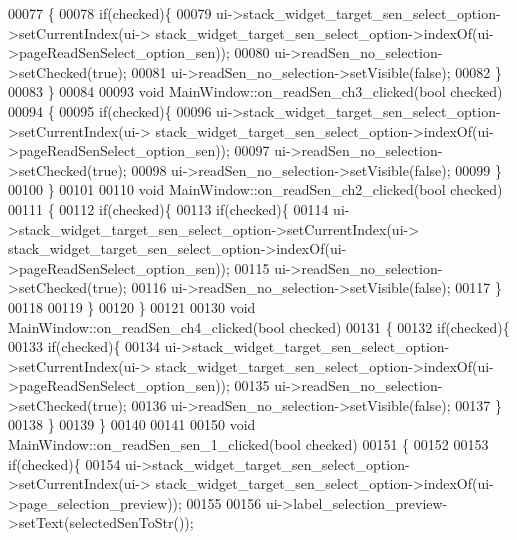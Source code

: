 \begin{DoxyCode}
00077 \{
00078     \textcolor{keywordflow}{if}(checked)\{
00079          ui->stack\_widget\_target\_sen\_select\_option->setCurrentIndex(ui->
      stack\_widget\_target\_sen\_select\_option->indexOf(ui->pageReadSenSelect\_option\_sen));
00080          ui->readSen\_no\_selection->setChecked(\textcolor{keyword}{true});
00081          ui->readSen\_no\_selection->setVisible(\textcolor{keyword}{false});
00082    \}
00083 \}
00084 
00093 \textcolor{keywordtype}{void} MainWindow::on\_readSen\_ch3\_clicked(\textcolor{keywordtype}{bool} checked)
00094 \{
00095     \textcolor{keywordflow}{if}(checked)\{
00096         ui->stack\_widget\_target\_sen\_select\_option->setCurrentIndex(ui->
      stack\_widget\_target\_sen\_select\_option->indexOf(ui->pageReadSenSelect\_option\_sen));
00097         ui->readSen\_no\_selection->setChecked(\textcolor{keyword}{true});
00098         ui->readSen\_no\_selection->setVisible(\textcolor{keyword}{false});
00099   \}
00100 \}
00101 
00110 \textcolor{keywordtype}{void} MainWindow::on\_readSen\_ch2\_clicked(\textcolor{keywordtype}{bool} checked)
00111 \{
00112     \textcolor{keywordflow}{if}(checked)\{
00113         \textcolor{keywordflow}{if}(checked)\{
00114              ui->stack\_widget\_target\_sen\_select\_option->setCurrentIndex(ui->
      stack\_widget\_target\_sen\_select\_option->indexOf(ui->pageReadSenSelect\_option\_sen));
00115              ui->readSen\_no\_selection->setChecked(\textcolor{keyword}{true});
00116              ui->readSen\_no\_selection->setVisible(\textcolor{keyword}{false});
00117        \}
00118 
00119    \}
00120 \}
00121 
00130 \textcolor{keywordtype}{void} MainWindow::on\_readSen\_ch4\_clicked(\textcolor{keywordtype}{bool} checked)
00131 \{
00132    \textcolor{keywordflow}{if}(checked)\{
00133        \textcolor{keywordflow}{if}(checked)\{
00134             ui->stack\_widget\_target\_sen\_select\_option->setCurrentIndex(ui->
      stack\_widget\_target\_sen\_select\_option->indexOf(ui->pageReadSenSelect\_option\_sen));
00135             ui->readSen\_no\_selection->setChecked(\textcolor{keyword}{true});
00136             ui->readSen\_no\_selection->setVisible(\textcolor{keyword}{false});
00137       \}
00138    \}
00139 \}
00140 
00141 
00150 \textcolor{keywordtype}{void} MainWindow::on\_readSen\_sen\_1\_clicked(\textcolor{keywordtype}{bool} checked)
00151 \{
00152 
00153     \textcolor{keywordflow}{if}(checked)\{
00154          ui->stack\_widget\_target\_sen\_select\_option->setCurrentIndex(ui->
      stack\_widget\_target\_sen\_select\_option->indexOf(ui->page\_selection\_preview));
00155 
00156           ui->label\_selection\_preview->setText(selectedSenToStr());

\end{DoxyCode}
